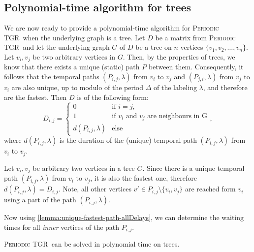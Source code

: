 \documentclass[a4paper,UKenglish,cleveref, autoref, thm-restate, anonymous]{lipics-v2021}
\newcommand{\deltaExact}{\textsc{Periodic TGR}}
\begin{document}
\subsection{Polynomial-time algorithm for trees}\label{sec:treealgo}
We are now ready to provide a polynomial-time algorithm for \deltaExact\ when the underlying graph is a tree.
Let $D$ be a matrix from \deltaExact\ and let the underlying graph $G$ of $D$ be a tree on $n$ vertices $\{v_1, v_2, \dots, v_n\}$.
Let $v_i,v_j$ be two arbitrary vertices in $G$. Then, by the properties of trees, we know that there exists a unique (static) path $P$ between them.
Consequently, it follows that the temporal paths $(P_{i,j},\lambda)$ from $v_i$ to $v_j$ and $(P_{j,i},\lambda)$ from $v_j$ to $v_i$ are also unique, up to modulo of the period $\Delta$ of the labeling $\lambda$,
and therefore are the fastest.
Then $D$ is of the following form:
\begin{equation*}
    D_{i,j} =
    \begin{cases}
    0 & \text{if $i = j$}, \\
    1 & \text{if $v_i$ and $v_j$ are neighbours in G}\\
    d(P_{i,j},\lambda) & \text{else}
    \end{cases},
\end{equation*}
where $d(P_{i,j},\lambda)$ is the duration of the (unique) temporal path $(P_{i,j},\lambda)$ from $v_i$ to $v_j$.

\begin{observation}\label{obs:travel-delays-in-trees}
    Let $v_i,v_j$  be arbitrary two vertices in a tree $G$. 
    Since there is a unique temporal path $(P_{i,j},\lambda)$ from $v_i$ to $v_j$, it is also the fastest one, therefore $d(P_{i,j},\lambda) = D_{i,j}$. 
    Note, all other vertices $v' \in P_{i,j} \setminus \{v_i,v_j\}$ are reached form $v_i$ using a part of the path $(P_{i,j},\lambda)$.
\end{observation}

Now using \cref{lemma:unique-fastest-path-allDelays}, we can determine the waiting times for all \emph{inner} vertices of the path $P_{i,j}$.

\begin{theorem} \label{thm:deltaExact-PolyTimeTrees}
    \deltaExact\ can be solved in polynomial time on trees.
\end{theorem}
\end{document}
